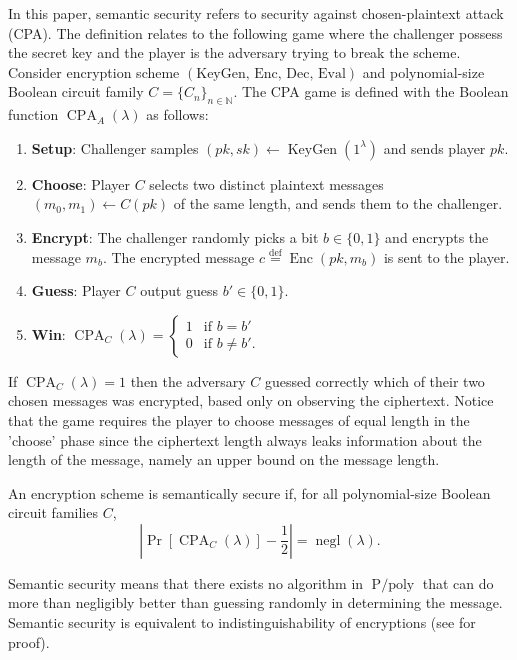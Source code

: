 In this paper, semantic security refers to security against chosen-plaintext attack (CPA). The definition relates to the following game where the challenger possess the secret key and the player is the adversary trying to break the scheme. Consider encryption scheme $(\text{KeyGen, Enc, Dec, Eval})$ and polynomial-size Boolean circuit family $C = \{C_n\}_{n\in \mathbb{N}}$. The CPA game is defined with the Boolean function $\operatorname{CPA}_{A}(\lambda)$ as follows:
\begin{enumerate}
  \item \textbf{Setup}: Challenger samples $(pk, sk) \leftarrow \operatorname{KeyGen}(1^{\lambda})$ and sends player $pk$.
  \item \textbf{Choose}: Player $C$ selects two distinct plaintext messages $(m_0, m_1) \leftarrow C(pk)$ of the same length, and sends them to the challenger.
  \item \textbf{Encrypt}: The challenger randomly picks a bit $b \in \{0, 1\}$ and encrypts the message $m_b$. The encrypted message $c \stackrel{\mathrm{def}}{=} \operatorname{Enc}(pk, m_b)$ is sent to the player.
  \item \textbf{Guess}: Player $C$ output guess $b' \in \{0,1\}$.
  \item \textbf{Win}: $\operatorname{CPA}_{C}(\lambda) = 
  \begin{cases}
  1 & \text{if } b = b'\\
  0 & \text{if } b \neq b'.
  \end{cases}$
\end{enumerate}

If $\operatorname{CPA}_{C}(\lambda) = 1$ then the adversary $C$ guessed correctly which of their two chosen messages was encrypted, based only on observing the ciphertext. Notice that the game requires the player to choose messages of equal length in the 'choose' phase since the ciphertext length always leaks information about the length of the message, namely an upper bound on the message length.
\begin{definition}
    An encryption scheme is semantically secure if, for all polynomial-size Boolean circuit families $C$, $$| \operatorname{Pr}[\operatorname{CPA}_{C}(\lambda)] - \frac{1}{2} | = \operatorname{negl}(\lambda).$$
\end{definition}
Semantic security means that there exists no algorithm in $\operatorname{P/poly}$ that can do more than negligibly better than guessing randomly in determining the message. Semantic security is equivalent to indistinguishability of encryptions (see \cite{Gol04} for proof).

